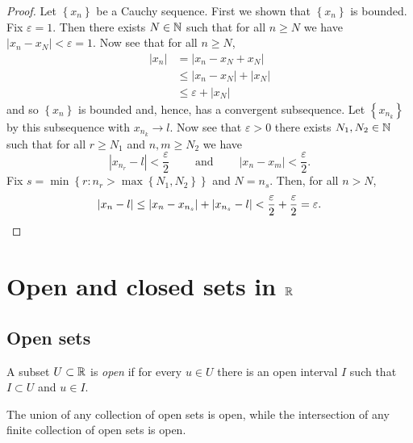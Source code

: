 \begin{proof}
	Let $\left\{ x_n \right\}$ be a Cauchy sequence.
	First we shown that $\left\{ x_n \right\}$ is bounded.
	Fix $\varepsilon = 1$.
	Then there exists $N \in \mathbb{N}$ such that for all $n \geq N$ we have
	$\left\lvert x_n - x_N \right\rvert < \varepsilon = 1$.
	Now see that for all $n \geq N$,
	\begin{align*}
		\left\lvert x_n \right\rvert 
		&=    \left\lvert x_n - x_N + x_N \right\rvert \\
		&\leq \left\lvert x_n - x_N \right\rvert 
			 + \left\lvert x_N \right\rvert \\ 
		&\leq \varepsilon + \left\lvert x_N \right\rvert
	\end{align*}
	and so $\left\{ x_n \right\}$ is bounded and, hence,
	has a convergent subsequence.
	Let $\left\{ x_{n_k} \right\}$ by this subsequence
	with $x_{n_k} \to l$.
	Now see that $\varepsilon > 0$ there exists $N_1, N_2 \in \mathbb{N}$ such that
	for all $r \geq N_1$ and $n,m \geq N_2$ we have \[
		\left\lvert x_{n_r} - l \right\rvert < \frac{\varepsilon}{2} 
		\qquad \;\text{and}\; \qquad
		\left\lvert x_n - x_m \right\rvert < \frac{\varepsilon}{2}.
	\]
	Fix $s = \min\left\{ r : n_r > \max\left\{ N_1, N_2 \right\} \right\}$
	and $N = n_s$.
	Then, for all $n > N$, \[
		\left\lvert x_n - l \right\rvert
		\leq \left\lvert x_n - x_{n_s} \right\rvert
			+ \left\lvert x_{n_s} - l \right\rvert
		< \frac{\varepsilon}{2} + \frac{\varepsilon}{2} 
		= \varepsilon. \qedhere
	\]
\end{proof}

\section{Open and closed sets in $\mathbb{R}$}
\subsection{Open sets}

\begin{definition}
	A subset $U \subset \mathbb{R}$ is \emph{open} if for every
	$u \in U$ there is an open interval $I$ such that $I \subset U$
	and $u \in I$.
\end{definition}

\begin{proposition}[]
	The union of any collection of open sets is open, 
	while the intersection of any finite collection of open sets is open.
\end{proposition}

